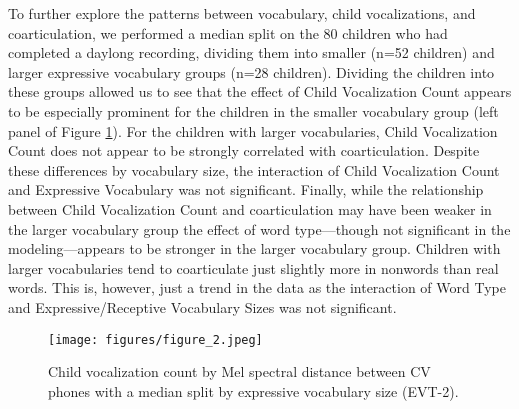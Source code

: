 \documentclass[a4paper,man,natbib,donotrepeattitle, apacite]{apa6}
\begin{document}
To further explore the patterns between vocabulary, child vocalizations, and coarticulation, we performed a median split on the 80 children who had completed a daylong recording, dividing them into smaller (n=52 children) and larger expressive vocabulary groups (n=28 children). Dividing the children into these groups allowed us to see that the effect of Child Vocalization Count appears to be especially prominent for the children in the smaller vocabulary group (left panel of Figure \ref{fig:figure-2}). For the children with larger vocabularies, Child Vocalization Count does not appear to be strongly correlated with coarticulation. Despite these differences by vocabulary size, the interaction of Child Vocalization Count and Expressive Vocabulary was not significant.  Finally, while the relationship between Child Vocalization Count and coarticulation may have been weaker in the larger vocabulary group the effect of word type---though not significant in the modeling---appears to be stronger in the larger vocabulary group. Children with larger vocabularies tend to coarticulate just slightly more in nonwords than real words. This is, however, just a trend in the data as the interaction of Word Type and Expressive/Receptive Vocabulary Sizes was not significant. 


\begin{figure}[H]
\centering
\texttt{[image: figures/figure\_2.jpeg]}
\caption{\label{fig:figure-2}Child vocalization count by Mel spectral distance between CV phones with a median split by expressive vocabulary size (EVT-2).}
\end{figure}
\end{document}

